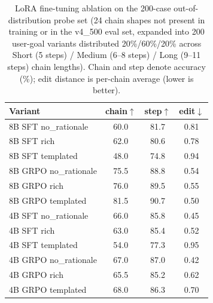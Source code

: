 \begin{table}[!ht]
\centering
\caption{LoRA fine-tuning ablation on the 200-case out-of-distribution probe set (24 chain shapes not present in training or in the v4\_500 eval set, expanded into 200 user-goal variants distributed 20\%/60\%/20\% across Short (5 steps) / Medium (6--8 steps) / Long (9--11 steps) chain lengths). Chain and step denote accuracy (\%); edit distance is per-chain average (lower is better).}
\label{tab:director_routing_lora_probe200}
\small
\setlength{\tabcolsep}{8pt}
\begin{tabular}{l|ccc}
\toprule
Variant & chain$\uparrow$ & step$\uparrow$ & edit$\downarrow$ \\
\midrule
8B SFT no\_rationale & 60.0 & 81.7 & 0.81 \\
8B SFT rich & 62.0 & 80.6 & 0.78 \\
8B SFT templated & 48.0 & 74.8 & 0.94 \\
8B GRPO no\_rationale & 75.5 & 88.8 & 0.54 \\
8B GRPO rich & 76.0 & 89.5 & 0.55 \\
8B GRPO templated & 81.5 & 90.7 & 0.50 \\
\midrule
4B SFT no\_rationale & 66.0 & 85.8 & 0.45 \\
4B SFT rich & 63.0 & 85.4 & 0.52 \\
4B SFT templated & 54.0 & 77.3 & 0.95 \\
4B GRPO no\_rationale & 67.0 & 87.0 & 0.42 \\
4B GRPO rich & 65.5 & 85.2 & 0.62 \\
4B GRPO templated & 68.0 & 86.3 & 0.70 \\
\bottomrule
\end{tabular}
\end{table}
